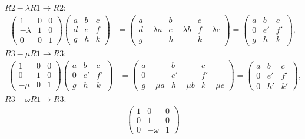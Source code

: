 \documentclass[
  letterpaper,
  DIV=11,
  numbers=noendperiod]{scrartcl}
\theoremstyle{remark}
\begin{document}
\(R2-\lambda R1\rightarrow R2\): \[\begin{aligned}
\left(\begin{array}{rrr}
1 & 0 & 0 \\
-\lambda & 1 & 0 \\
0 & 0 & 1
\end{array}\right)
\left(\begin{array}{rrr}
a & b & c\\
d & e & f \\
g & h & k
\end{array}\right) &=
\left(\begin{array}{rrr}
a & b & c \\
d-\lambda a & e-\lambda b & f-\lambda c \\
g & h & k
\end{array}\right) =
\left(\begin{array}{rrr}
a & b & c \\
0 & e' & f' \\
g & h & k
\end{array}\right),
\end{aligned}\] \(R3-\mu R1\rightarrow R3\): \[\begin{aligned}
\left(\begin{array}{rrr}
1 & 0 & 0 \\
0 & 1 & 0 \\
-\mu & 0 & 1
\end{array}\right)
\left(\begin{array}{rrr}
a & b & c\\
0 & e' & f' \\
g & h & k
\end{array}\right) &=
\left(\begin{array}{rrr}
a & b & c \\
0 & e' & f' \\
g-\mu a & h-\mu b & k-\mu c
\end{array}\right) =
\left(\begin{array}{rrr}
a & b & c \\
0 & e' & f' \\
0 & h' & k'
\end{array}\right),
\end{aligned}\] \(R3-\omega R1\rightarrow R3\): \[\begin{aligned}
\left(\begin{array}{rrr}
1 & 0 & 0 \\
0 & 1 & 0 \\
0 & -\omega & 1
\end{array}\right)

\end{aligned}\]
\end{document}
